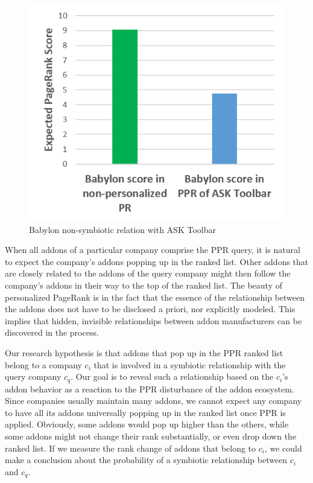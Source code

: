 \documentclass[11pt,oneside]{book}
\begin{document}
\begin{figure}[!htbp]
\centering
\includegraphics[width=\linewidth]{figures/babylon_nosym_ask.png}
\caption{Babylon non-symbiotic relation with ASK Toolbar}
\label{fig:babylon_nosym_ask}
\end{figure}
\fi

When all addons of a particular company comprise the PPR query, it is natural to expect the company's addons popping up in the ranked list. Other addons that are closely related to the addons of the query company might then follow the company's addons in their way to the top of the ranked list. The beauty of personalized PageRank is in the fact that the essence of the relationship between the addons does not have to be disclosed a priori, nor explicitly modeled. This implies that hidden, invisible relationships between addon manufacturers can be discovered in the process.

Our research hypothesis is that addons that pop up in the PPR ranked list belong to a company $c_i$ that is involved in a symbiotic relationship with the query company $c_q$. Our goal is to reveal such a relationship based on the $c_i$'s addon behavior as a reaction to the PPR disturbance of the addon ecosystem. Since companies usually maintain many addons, we cannot expect any company to have all its addons universally popping up in the ranked list once PPR is applied. Obviously, some addons would pop up higher than the others, while some addons might not change their rank substantially, or even drop down the ranked list. If we measure the rank change of addons that belong to $c_i$, we could make a conclusion about the probability of a symbiotic relationship between $c_i$ and $c_q$.
\end{document}
